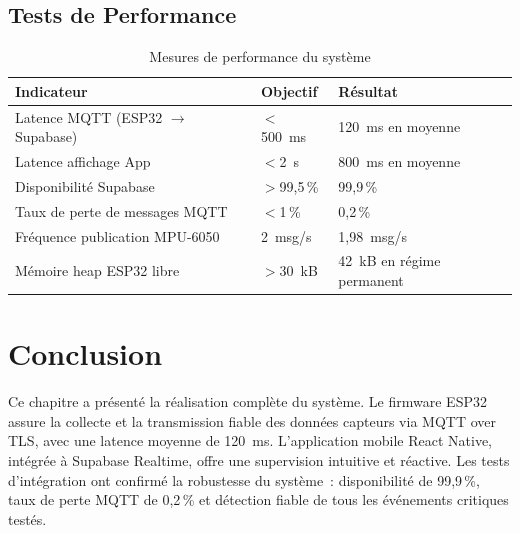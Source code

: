 \documentclass[12pt, a4paper]{report}
\begin{document}
\subsection{Tests de Performance}

\begin{table}[H]
  \centering
  \caption{Mesures de performance du système}
  \label{tab:test_perf}
  \renewcommand{\arraystretch}{1.4}
  \small
  \begin{tabularx}{\textwidth}{|X|p{3cm}|p{3.2cm}|}
    \hline
    \rowcolor{isimablue!20}
    \textbf{Indicateur} & \textbf{Objectif} & \textbf{Résultat} \\
    \hline
    Latence MQTT (ESP32 $\to$ Supabase) & $<$500~ms & 120~ms en moyenne \\
    \hline
    Latence affichage App & $<$2~s & 800~ms en moyenne \\
    \hline
    Disponibilité Supabase & $>$99,5\,\% & 99,9\,\% \\
    \hline
    Taux de perte de messages MQTT & $<$1\,\% & 0,2\,\% \\
    \hline
    Fréquence publication MPU-6050 & 2~msg/s & 1,98~msg/s \\
    \hline
    Mémoire heap ESP32 libre & $>$30~kB & 42~kB en régime permanent \\
    \hline
  \end{tabularx}
\end{table}

\section*{Conclusion}

\begin{chapterconclusion}
Ce chapitre a présenté la réalisation complète du système. Le firmware ESP32 assure
la collecte et la transmission fiable des données capteurs via MQTT over TLS, avec
une latence moyenne de 120~ms. L'application mobile React Native, intégrée à Supabase
Realtime, offre une supervision intuitive et réactive. Les tests d'intégration ont
confirmé la robustesse du système~: disponibilité de 99,9\,\%, taux de perte MQTT
de 0,2\,\% et détection fiable de tous les événements critiques testés.
\end{chapterconclusion}

\clearpage
\end{document}
